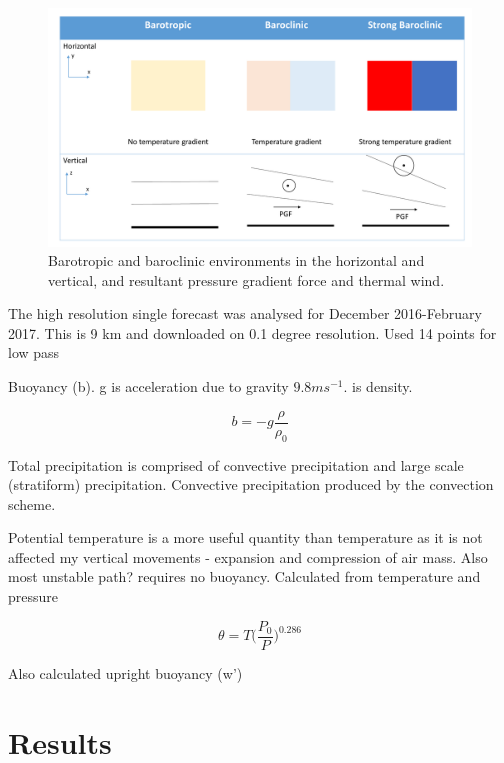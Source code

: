 \begin{figure}
	
	\includegraphics[width=34pc,angle=0]{barotropic2.pdf}
	\caption{Barotropic and baroclinic environments in the horizontal and vertical, and resultant pressure gradient force and thermal wind.}\label{fig:barotropic}
	\centering
\end{figure}

The high resolution single forecast was analysed for December 2016-February 2017. This is 9 km and downloaded on 0.1 degree resolution. Used 14 points for low pass

Buoyancy (b). g is acceleration due to gravity \(9.8ms^{-1}\). {\rho} is density.

\begin{equation} \label{eq_b}
b = -g\frac{\rho}{\rho_0}
\end{equation}

Total precipitation is comprised of convective precipitation and large scale (stratiform) precipitation. Convective precipitation produced by the convection scheme. 

Potential temperature is a more useful quantity than temperature as it is not affected my vertical movements - expansion and compression of air mass. Also most unstable path? requires no buoyancy. Calculated from temperature and pressure

\begin{equation} \label{eq_theta}
\theta =  T \big(\frac{P_0}{P}) ^{0.286}
\end{equation}

Also calculated upright buoyancy (w'{\alpha})

\section{Results}

